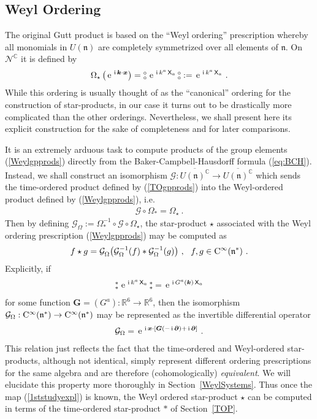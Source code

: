 \documentclass[11pt,a4paper]{article}
\newcommand{\NO}{\mbox{$\substack{\circ\\\circ}$}}      %
\newcommand{\NOa}{\mbox{$\substack{\ast\\\ast}$}}       %
\newcommand{\1}{\mathbb{1}}
\newcommand{\mbf}[1]{{\boldsymbol {#1} }}
\def\ii{{\,{\rm i}\,}}
\def\CC{{\rm C}}
\def\X{{\sf X}}
\def\mx{{\mbf x}}
\def\mk{{\mbf k}}
\def\mG{{\mbf G}}
\def\mfn{{\mathfrak n}}
\newcommand{\complex}{{\mathbb C}} %
\newcommand{\real}{{\mathbb R}} %
\def\e{{\,\rm e}\,}
\newcommand{\beq}{\begin{eqnarray}}
\newcommand{\eeq}{\end{eqnarray}}
\begin{document}
\subsection{Weyl Ordering\label{WOP}}

The original Gutt product is based on the ``Weyl ordering''
prescription whereby all monomials  in $U(\mfn)$ are completely
symmetrized over all elements of $\mfn$. On
$\mathcal{N}^\complex$ it is defined by
\beq
\Omega_\star\left(\e^{\ii\mk\cdot\mx}\right)=
\NO\,\e^{\ii k^a\,\X_a}\,\NO:=\e^{\ii k^a\,\X_a} \ .
\label{Weylgpprods}\eeq
While this ordering is usually thought of as the ``canonical''
ordering for the construction of star-products, in our case it turns
out to be drastically more complicated than the other
orderings. Nevertheless, we shall present here its explicit
construction for the sake of completeness and for later comparisons.

It is an extremely arduous task to compute products of the group
elements (\ref{Weylgpprods}) directly from the
Baker-Campbell-Hausdorff formula (\ref{eq:BCH}). Instead, we shall
construct an isomorphism $\mathcal{G}:\overline{U(\mfn)^\complex}\to
\overline{U(\mfn)^\complex}$ which sends the time-ordered product defined by
(\ref{TOgpprods}) into the Weyl-ordered product defined by
(\ref{Weylgpprods}), i.e.
\beq
\mathcal{G}\circ\Omega_*=\Omega_\star \ .
\label{1ststudy}\eeq
Then by defining
$\mathcal{G}_\Omega:=\Omega_*^{-1}\circ\mathcal{G}\circ\Omega^{~}_\star$,
the star-product $\star$ associated with the Weyl ordering
prescription (\ref{Weylgpprods}) may be computed as
\beq
f\star g=\mathcal{G}^{~}_\Omega\bigl(\mathcal{G}_\Omega^{-1}(f)*
\mathcal{G}_\Omega^{-1}(g)\bigr) \ , ~~ f,g\in\CC^\infty(\mfn^*) \ .
\label{WeylTOrel}\eeq
Explicitly, if
\beq
\NOa\,\e^{\ii k^a\,\X_a}\,\NOa=\e^{\ii G^a(\mk)\,\X_a}
\label{1ststudyexpl}\eeq
for some function $\mG=(G^a):\real^6\to\real^6$, then the isomorphism
$\mathcal{G}_\Omega:\CC^\infty(\mfn^*)\to\CC^\infty(\mfn^*)$ may
be represented as the invertible differential operator
\beq
\mathcal{G}_\Omega=\e^{\ii\mx\cdot[\mG(-\ii\mbf\partial)+\ii\mbf
\partial]} \ .
\label{Gdiffop}\eeq
This relation just reflects the fact that the time-ordered and
Weyl-ordered star-products, although not identical, simply represent
different ordering prescriptions for the same algebra and are
therefore (cohomologically) {\it
  equivalent}. We will elucidate this property more thoroughly in
Section~\ref{WeylSystems}. Thus once the map (\ref{1ststudyexpl}) is
known, the Weyl ordered star-product $\star$ can be computed in terms
of the time-ordered star-product $*$ of Section~\ref{TOP}.
\end{document}
